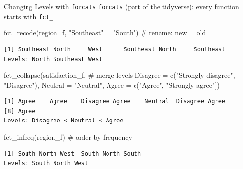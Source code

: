 \documentclass[
  ignorenonframetext,
  aspectratio=169,
]{beamer}
\newenvironment{Shaded}{\begin{snugshade}}{\end{snugshade}}
\newcommand{\AttributeTok}[1]{\textcolor[rgb]{0.40,0.45,0.13}{#1}}
\newcommand{\CommentTok}[1]{\textcolor[rgb]{0.37,0.37,0.37}{#1}}
\newcommand{\FunctionTok}[1]{\textcolor[rgb]{0.28,0.35,0.67}{#1}}
\newcommand{\NormalTok}[1]{\textcolor[rgb]{0.00,0.23,0.31}{#1}}
\newcommand{\OtherTok}[1]{\textcolor[rgb]{0.00,0.23,0.31}{#1}}
\newcommand{\StringTok}[1]{\textcolor[rgb]{0.13,0.47,0.30}{#1}}
\begin{document}
\begin{frame}[fragile]{Changing Levels with \texttt{forcats}}
\protect\hypertarget{changing-levels-with-forcats}{}
\texttt{forcats} (part of the tidyverse): every function starts with
\texttt{fct\_}

\begin{Shaded}
\begin{Highlighting}[]
\FunctionTok{fct\_recode}\NormalTok{(region\_f, }\StringTok{"Southeast"} \OtherTok{=} \StringTok{"South"}\NormalTok{)     }\CommentTok{\# rename: new = old}
\end{Highlighting}
\end{Shaded}

\begin{verbatim}
[1] Southeast North     West      Southeast North     Southeast
Levels: North Southeast West
\end{verbatim}

\begin{Shaded}
\begin{Highlighting}[]
\FunctionTok{fct\_collapse}\NormalTok{(satisfaction\_f,                    }\CommentTok{\# merge levels}
             \AttributeTok{Disagree =} \FunctionTok{c}\NormalTok{(}\StringTok{"Strongly disagree"}\NormalTok{, }\StringTok{"Disagree"}\NormalTok{),}
             \AttributeTok{Neutral  =} \StringTok{"Neutral"}\NormalTok{,}
             \AttributeTok{Agree    =} \FunctionTok{c}\NormalTok{(}\StringTok{"Agree"}\NormalTok{, }\StringTok{"Strongly agree"}\NormalTok{))}
\end{Highlighting}
\end{Shaded}

\begin{verbatim}
[1] Agree    Agree    Disagree Agree    Neutral  Disagree Agree   
[8] Agree   
Levels: Disagree < Neutral < Agree
\end{verbatim}

\begin{Shaded}
\begin{Highlighting}[]
\FunctionTok{fct\_infreq}\NormalTok{(region\_f)                            }\CommentTok{\# order by frequency}
\end{Highlighting}
\end{Shaded}

\begin{verbatim}
[1] South North West  South North South
Levels: South North West
\end{verbatim}
\end{frame}
\end{document}
